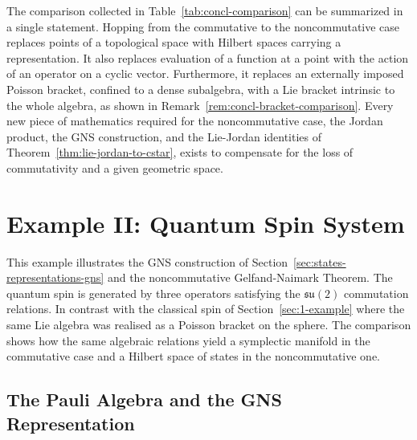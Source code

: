 	\noindent The comparison collected in Table~\ref{tab:concl-comparison} can be summarized in a single statement. Hopping from the commutative to the noncommutative case replaces points of a topological space with Hilbert spaces carrying a representation. It also replaces evaluation of a function at a point with the action of an operator on a cyclic vector. Furthermore, it replaces an externally imposed Poisson bracket, confined to a dense subalgebra, with a Lie bracket intrinsic to the whole algebra, as shown in Remark~\ref{rem:concl-bracket-comparison}. Every new piece of mathematics required for the noncommutative case, the Jordan product, the GNS construction, and the Lie-Jordan identities of Theorem~\ref{thm:lie-jordan-to-cstar}, exists to compensate for the loss of commutativity and a given geometric space.
	
	\section{Example II: Quantum Spin System}
	\label{sec:2-example}
	
	This example illustrates the GNS construction of Section~\ref{sec:states-representations-gns} and the noncommutative Gelfand-Naimark Theorem. The quantum spin is generated by three operators satisfying the $\mathfrak{su}(2)$ commutation relations. In contrast with the classical spin of Section~\ref{sec:1-example} where the same Lie algebra was realised as a Poisson bracket on the sphere. The comparison shows how the same algebraic relations yield a symplectic manifold in the commutative case and a Hilbert space of states in the noncommutative one.
 	
 	\subsection*{The Pauli Algebra and the GNS Representation}
 	
